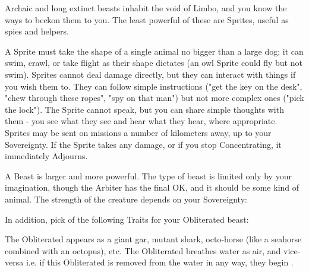   \begin{multicols*}{2}



Archaic and long extinct beasts inhabit the void of Limbo, and you know the ways to beckon them to you. The least powerful of these are Sprites, useful as spies and helpers.

  A Sprite must take the shape of a single animal no bigger than a large dog; it can swim, crawl, or take flight as their shape dictates (an owl Sprite could fly but not swim). Sprites cannot deal damage directly, but they can interact with things if you wish them to. They can follow simple instructions ("get the key on the desk", "chew through these ropes", "spy on that man") but not more complex ones ("pick the lock").  The Sprite cannot speak, but you can share simple thoughts with them - you see what they see and hear what they hear, where appropriate. Sprites may be sent on missions a number of kilometers away, up to your \MAX Sovereignty. If the Sprite takes any damage, or if you stop Concentrating, it immediately Adjourns.

 A Beast is larger and more powerful. The type of beast is limited only by your imagination, though the Arbiter has the final OK, and it should be some kind of animal. The strength of the creature depends on your \MAX Sovereignty:


In addition, pick  of the following Traits for your Obliterated beast:


 The Obliterated appears as a giant gar, mutant shark, octo-horse (like a seahorse combined with an octopus), etc. The Obliterated breathes water as air, and vice-versa i.e. if this Obliterated is removed from the water in any way, they begin .


\end{multicols*}
